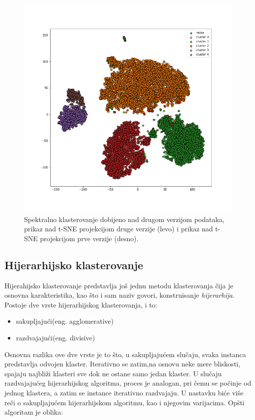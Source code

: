 \documentclass[a4paper]{article}
\begin{document}
\begin{figure}[ht]
	\includegraphics[scale=0.25]{spektral_v2_prikaz_na_v1}
	\caption{Spektralno klasterovanje dobijeno nad drugom verzijom podataka, prikaz nad t-SNE projekcijom druge verzije (levo) i prikaz nad t-SNE projekcijom prve verzije (desno).}
	\label{spektral_v2_prikaz_na_v1}
\end{figure}



\subsection{Hijerarhijsko klasterovanje}

Hijerahijsko klasterovanje predstavlja još jednu metodu klasterovanja čija je osnovna karakteristika, kao što i sam naziv govori, konstruisanje \textit{hijerarhija}. Postoje dve vrste hijerarhijskog klasterovanja, i to:
\begin{itemize}
\item sakupljajući(eng. agglomerative)
\item razdvajajući(eng. divisive)
\end{itemize}

Osnovna razlika ove dve vrste je to što, u sakupljajućem slučaju, svaka instanca predstavlja odvojen klaster. Iterativno se zatim,na osnovu neke mere bliskosti, spajaju najbliži klasteri sve dok ne ostane samo jedan klaster. U slučaju razdvajajućeg hijerarhijskog algoritma, proces je analogan, pri čemu se počinje od jednog klastera, a zatim se instance iterativno razdvajaju.
U nastavku biće više reči o sakupljajućem hijerarhijskom algoritmu, kao i njegovim varijacima. Opšti algoritam je oblika:
\end{document}

